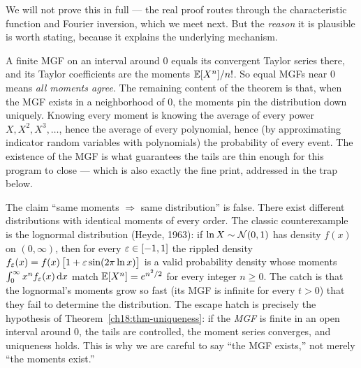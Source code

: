We will not prove this in full --- the real proof routes through the
characteristic function and Fourier inversion, which we meet next. But the
\emph{reason} it is plausible is worth stating, because it explains the
underlying mechanism.

\begin{whybox}
A finite MGF on an interval around $0$ equals its convergent Taylor series there, and its Taylor
coefficients are the moments $\operatorname{\mathbb{E}}[X^n]/n!$. So equal MGFs near $0$ means
\emph{all moments agree}. The remaining content of the theorem is that, when the
MGF exists in a neighborhood of $0$, the moments pin the distribution down
uniquely. Knowing every moment is knowing the average of every
power $X,X^2,X^3,\dots$, hence the average of every polynomial, hence
(by approximating indicator random variables with polynomials) the probability of every event.
The existence of the MGF is what guarantees the tails are thin enough for this
program to close --- which is also exactly the fine print, addressed in the
trap below.
\end{whybox}

\begin{trapbox}
\label{ch18:trap-moments}
The claim ``same moments $\Rightarrow$ same distribution'' is false.
There exist different distributions with identical moments of every order. The classic counterexample
is the lognormal distribution (Heyde, 1963): if $\ln X \sim \mathcal{N}(0,1)$ has density
$f(x)$ on $(0,\infty)$, then for every $\varepsilon \in [-1, 1]$ the rippled density
$f_\varepsilon(x) = f(x)\,\big[1 + \varepsilon\sin(2\pi\ln x)\big]$ is a valid probability density
whose moments $\int_0^\infty x^n f_\varepsilon(x)\,\mathrm{d} x$ match $\operatorname{\mathbb{E}}[X^n] = e^{n^2/2}$ for
every integer $n \ge 0$. The catch is that
the lognormal's moments grow so fast (its MGF is infinite for every $t>0$) that
they fail to determine the distribution. The escape hatch is precisely the
hypothesis of Theorem~\ref{ch18:thm-uniqueness}: if the \emph{MGF} is finite in
an open interval around $0$, the tails are controlled, the moment series
converges, and uniqueness holds. This is why we are careful to say ``the MGF
exists,'' not merely ``the moments exist.''
\end{trapbox}

